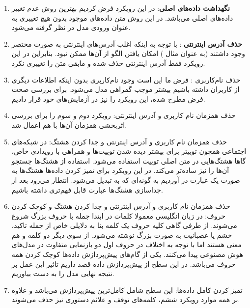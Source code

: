 \begin{enumerate}
	\item 	\textbf{نگهداشت داده‌های اصلی}:
در این رویکرد فرض کردیم بهترین روش عدم تغییر داده‌های اصلی می‌باشد. در این روش متن داده‌های موجود بدون هیچ تغییری به عنوان ورودی مدل در نظر گرفته می‌شود.
	\item \textbf{ حذف آدرس‌ اینترنتی}
	: با توجه به اینکه اغلب آدرس‌های اینترنتی به صورت مختصر وجود داشتند (به عنوان مثال
	\href{https://t.co/rs1vhBp2ax}{})
	امکان یافتن الگو از آن‌ها ممکن نبود. بنابراین در این رویکرد فقط آدرس اینترنتی حذف شده و مابقی متن را تغییری نکرد.
	\item حذف نام‌کاربری
	:
فرض ما این است وجود نام‌کاربری بدون اینکه اطلاعات دیگری از کاربران داشته باشیم بیشتر موجب گمراهی مدل می‌شود. برای بررسی صحت فرض مطرح شده، این رویکرد را نیز در آزمایش‌های خود قرار دادیم.
	\item حذف همزمان نام کاربری و آدرس اینترنتی:
رویکرد دوم و سوم را برای بررسی اثربخشی همزمان آن‌ها با هم اعمال شد.

	\item حذف همزمان نام کاربری و آدرس اینترنتی و جدا کردن هشتگ: 
	در شبکه‌های اجتماعی همچون توییتر برای بیشتر دیده شدن توییت‌ها و همراهی با رویدادی خاص، گاها هشتگ‌هایی در متن اصلی توییت استفاده می‌شود. استفاده از  هشتگ‌ها جستجو آن‌ها را نیز ساده‌تر می‌کند. در این رویکرد برای تمیز کردن داده‌ها هشتگ‌ها به صورت یک عبارت در آوردیم به گونه‌ای که
به
 تبدیل می‌شود. انتطار می‌رود بعد از جداسازی هشتگ‌ها عبارت قابل فهم‌تری داشته باشیم.
 
	\item حذف همزمان نام کاربری و آدرس اینترنتی و جدا کردن هشتگ و کوچک کردن حروف:
در زبان انگلیسی معمولا کلمات در ابتدا جمله با حروف بزرگ شروع می‌شوند. از طرفی گاهی کلیه حروف یک کلمه بنا به دلایلی خاص از جمله تاکید، خشم یا عصبانیت به صورت بزرگ نوشته می‌شود. از سوی دیگر دو کلمه
و
هم معنی هستند اما با توجه به اختلاف در حروف اول دو بازنمایی متفاوت در مدل‌های هوش مصنوعی پیدا می‌کنند. یکی از گام‌های پیش‌پردازش داده‌ها کوچک کردن همه حروف
می‌باشد. در این سطح از پیش‌پردازش داده قصد داریم تاثیر این عمل بر نتیجه نهایی  مدل را به دست بیاوریم.
	\item تمیز کردن کامل داده‌ها:
	این سطح شامل کامل‌ترین پیش‌پردازش می‌باشد و علاوه بر همه موارد رویکرد ششم، کلمه‌های توقف
	و علائم دستوری نیز حذف می‌شوند.
\end{enumerate}

